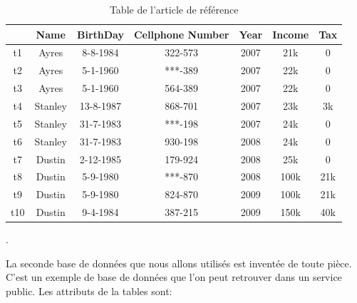 \documentclass[letterpaper, 12pt]{report}
\begin{document}
\begin{table}[H]
	\centering
	\begin{tabular}{|c|c c c c c c|}
	\hline
	    & Name & BirthDay & Cellphone Number & Year & Income & Tax\\
	\hline
	 t1 & Ayres & 8-8-1984 & 322-573 & 2007 & 21k & 0\\
	 t2 & Ayres & 5-1-1960 & ***-389 & 2007 & 22k & 0 \\
	 t3 & Ayres & 5-1-1960 & 564-389 & 2007 & 22k & 0 \\
	 t4 & Stanley & 13-8-1987 & 868-701 & 2007 & 23k & 3k\\
	 t5 & Stanley & 31-7-1983 & ***-198 & 2007 & 24k & 0\\
	 t6 & Stanley & 31-7-1983 & 930-198 & 2008 & 24k & 0\\
	 t7 & Dustin & 2-12-1985 & 179-924 & 2008 & 25k & 0 \\
	 t8 & Dustin & 5-9-1980 & ***-870 & 2008 & 100k & 21k \\
	 t9 & Dustin & 5-9-1980 & 824-870 & 2009 & 100k & 21k \\
	 t10 & Dustin & 9-4-1984 & 387-215 & 2009 & 150k & 40k \\
	 \hline
	\end{tabular}
	\caption{\label{tableMain} Table de l'article de référence}.
\end{table}

La seconde base de données que nous allons utilisés est inventée de toute pièce. C'est un exemple de base de données que l'on peut retrouver dans un service public.
Les attributs de la tables sont:
\end{document}
